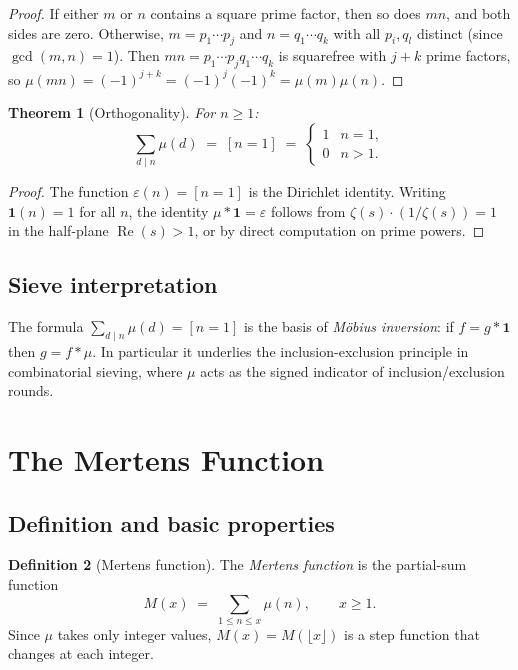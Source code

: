 \documentclass[12pt,a4paper]{amsart}
\newtheorem{theorem}{Theorem}[section]
\theoremstyle{definition}
\newtheorem{definition}[theorem]{Definition}
\begin{document}
\begin{proof}
If either $m$ or $n$ contains a square prime factor, then so does $mn$, and
both sides are zero.  Otherwise, $m = p_1 \cdots p_j$ and $n = q_1 \cdots q_k$
with all $p_i, q_l$ distinct (since $\gcd(m,n)=1$).  Then
$mn = p_1 \cdots p_j q_1 \cdots q_k$ is squarefree with $j+k$ prime factors,
so $\mu(mn)=(-1)^{j+k}=(-1)^j(-1)^k=\mu(m)\mu(n)$.
\end{proof}

\begin{theorem}[Orthogonality]
\label{thm:mobius-ortho}
For $n \ge 1$:
\[
  \sum_{d \mid n} \mu(d) \;=\; [n = 1] \;=\;
  \begin{cases} 1 & n=1, \\ 0 & n>1. \end{cases}
\]
\end{theorem}

\begin{proof}
The function $\varepsilon(n) = [n=1]$ is the Dirichlet identity.  Writing
$\mathbf{1}(n)=1$ for all $n$, the identity $\mu * \mathbf{1} = \varepsilon$
follows from $\zeta(s)\cdot(1/\zeta(s))=1$ in the half-plane
$\operatorname{Re}(s)>1$, or by direct computation on prime powers.
\end{proof}

\subsection{Sieve interpretation}

The formula $\sum_{d \mid n}\mu(d) = [n=1]$ is the basis of \emph{Möbius
inversion}: if $f = g * \mathbf{1}$ then $g = f * \mu$.  In particular it
underlies the inclusion-exclusion principle in combinatorial sieving, where
$\mu$ acts as the signed indicator of inclusion/exclusion rounds.

\section{The Mertens Function}
\label{sec:mertens-function}

\subsection{Definition and basic properties}

\begin{definition}[Mertens function]
\label{def:mertens}
The \emph{Mertens function} is the partial-sum function
\[
  M(x) \;=\; \sum_{1 \le n \le x} \mu(n), \qquad x \ge 1.
\]
Since $\mu$ takes only integer values, $M(x) = M(\lfloor x \rfloor)$ is a
step function that changes at each integer.
\end{definition}
\end{document}
